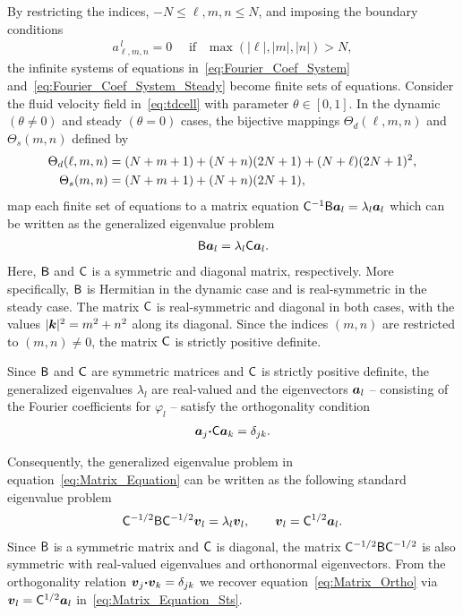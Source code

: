 \documentclass[amsa]{ipart}
\begin{document}
By restricting the indices, $-N\leq \ell,m,n\leq N$, and imposing the boundary
conditions
%
\begin{align}
  a^{\,l}_{\ell,m,n}=0 \quad \text{ if } \ \ \max(|\ell|,|m|,|n|)>N,
\end{align}
%
the infinite systems of equations in~\eqref{eq:Fourier_Coef_System}
and~\eqref{eq:Fourier_Coef_System_Steady} become finite sets of
equations. Consider the fluid velocity field in~\eqref{eq:tdcell} with
parameter $\theta\in[0,1]$. In the dynamic $(\theta\neq0)$ and steady $(\theta=0)$ cases,
the bijective mappings $\Theta_d(\ell,m,n)$ and $\Theta_s(m,n)$ defined by 
%
\begin{align}\label{eq:Bijections}
  \Theta_d(\ell,m,n)&=(N+m+1)+(N+n)(2N+1)+(N+\ell)(2N+1)^2,
  \\
  \Theta_s(m,n)&=(N+m+1)+(N+n)(2N+1),
  \notag
\end{align}
%
map each finite set of equations to a matrix equation
$\mathsf{C}^{-1}\mathsf{B}\boldsymbol{a}_l=\lambda_l\boldsymbol{a}_l$ which can be written as the
generalized eigenvalue problem   
%
\begin{align}\label{eq:Matrix_Equation}
  \Bm\veca_l=\lambda_l \Cm\veca_l.
\end{align}
%
Here, $\mathsf{B}$ and $\mathsf{C}$ is a symmetric and diagonal matrix,
respectively. More specifically, $\mathsf{B}$ is Hermitian in the dynamic
case and is real-symmetric in the steady case. The matrix $\mathsf{C}$ is
real-symmetric and diagonal in both cases, with the values
$|\boldsymbol{k}|^2=m^2+n^2$ along its diagonal. Since the indices $(m,n)$ are 
restricted to $(m,n)\neq0$, the matrix $\mathsf{C}$ is strictly positive definite. 


Since $\mathsf{B}$ and $\mathsf{C}$ are symmetric matrices and $\mathsf{C}$ is strictly
positive definite, the generalized eigenvalues $\lambda_l$ are real-valued
and the eigenvectors $\boldsymbol{a}_l$ -- consisting of the Fourier
coefficients for $\varphi_l$ -- satisfy the orthogonality
condition~\cite{Parlett:1980}     
%
\begin{align}\label{eq:Matrix_Ortho}
  \veca_j\bcdot\Cm\veca_k=\delta_{jk}.
\end{align}
%




Consequently, the generalized eigenvalue problem in
equation~\eqref{eq:Matrix_Equation} can be written as the following
standard eigenvalue problem 
%
\begin{align}\label{eq:Matrix_Equation_Sts}
  \Cm^{-1/2}\Bm\Cm^{-1/2}\vecv_l=\lambda_l\vecv_l,
  \qquad
  \vecv_l=\Cm^{1/2}\veca_l.
\end{align}
%
Since $\mathsf{B}$ is a symmetric matrix and $\mathsf{C}$ is diagonal, the matrix
$\mathsf{C}^{-1/2}\mathsf{B}\mathsf{C}^{-1/2}$ is also symmetric with real-valued
eigenvalues and orthonormal eigenvectors. From the
orthogonality relation $\boldsymbol{v}_j\mbox{\boldmath${\cdot}$}\boldsymbol{v}_k=\delta_{jk}$ we recover
equation~\eqref{eq:Matrix_Ortho} via $\boldsymbol{v}_l=\mathsf{C}^{1/2}\boldsymbol{a}_l$
in~\eqref{eq:Matrix_Equation_Sts}. 
\end{document}
